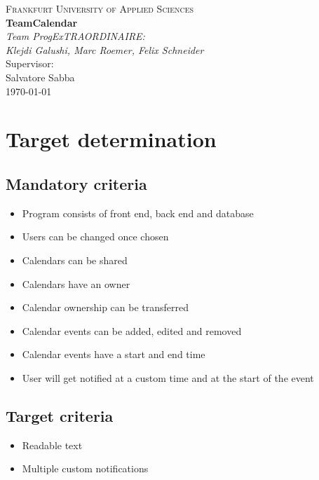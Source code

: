 \documentclass[]{article}
\begin{document}
	\begin{titlepage}
		\centering
		\vspace*{0cm}
		{\scshape\Large Frankfurt University of Applied Sciences}\\[3cm]
		{\huge\bfseries TeamCalendar}\\[8cm]
		{\Large\itshape Team ProgExTRAORDINAIRE:}\\
		{\Large\itshape Klejdi Galushi, Marc Roemer, Felix Schneider}\\[3cm]
		Supervisor:\\
		Salvatore Sabba\\[1cm]
		{\large \today}
	\end{titlepage}
	\newpage
	\tableofcontents
	\newpage
	
\section{Target determination}
	\subsection{Mandatory criteria}
		\begin{itemize}
			\item Program consists of front end, back end and database
			\item Users can be changed once chosen
			\item Calendars can be shared
			\item Calendars have an owner
			\item Calendar ownership can be transferred
			\item Calendar events can be added, edited and removed
			\item Calendar events have a start and end time
			\item User will get notified at a custom time and at the start of the event
		\end{itemize}
	\subsection{Target criteria}
		\begin{itemize}
			\item Readable text
			\item Multiple custom notifications
		\end{itemize}
\end{document}
